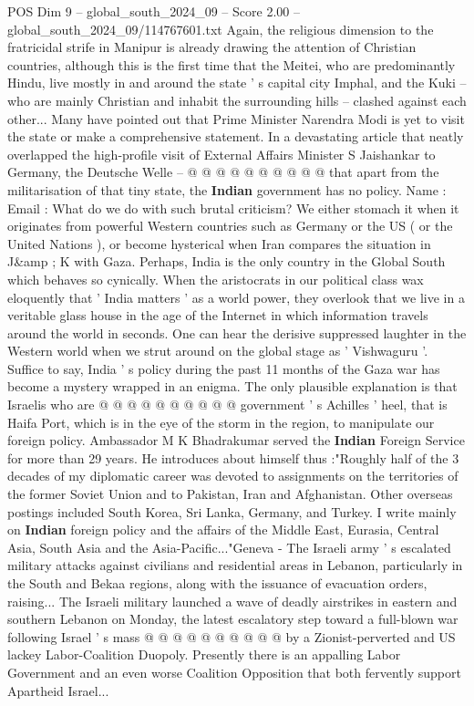 \begin{textsample}{POS Dim 9 – global\_south\_2024\_09 – Score 2.00 – global\_south\_2024\_09/114767601.txt}
Again, the religious dimension to the fratricidal strife in Manipur is already drawing the attention of Christian countries, although this is the first time that the Meitei, who are predominantly Hindu, live mostly in and around the state ' s capital city Imphal, and the Kuki -- who are mainly Christian and inhabit the surrounding hills -- clashed against each other...
Many have pointed out that Prime Minister Narendra Modi is yet to visit the state or make a comprehensive statement.
In a devastating article that neatly overlapped the high-profile visit of External Affairs Minister S Jaishankar to Germany, the Deutsche Welle -- @ @ @ @ @ @ @ @ @ @ that apart from the militarisation of that tiny state, the \textbf{Indian} government has no policy.
Name : Email : What do we do with such brutal criticism?
We either stomach it when it originates from powerful Western countries such as Germany or the US ( or the United Nations ), or become hysterical when Iran compares the situation in J\&amp ; K with Gaza.
Perhaps, India is the only country in the Global South which behaves so cynically.
When the aristocrats in our political class wax eloquently that ' India matters ' as a world power, they overlook that we live in a veritable glass house in the age of the Internet in which information travels around the world in seconds.
One can hear the derisive suppressed laughter in the Western world when we strut around on the global stage as ' Vishwaguru '.
Suffice to say, India ' s policy during the past 11 months of the Gaza war has become a mystery wrapped in an enigma.
The only plausible explanation is that Israelis who are @ @ @ @ @ @ @ @ @ @ government ' s Achilles ' heel, that is Haifa Port, which is in the eye of the storm in the region, to manipulate our foreign policy.
Ambassador M K Bhadrakumar served the \textbf{Indian} Foreign Service for more than 29 years.
He introduces about himself thus :"Roughly half of the 3 decades of my diplomatic career was devoted to assignments on the territories of the former Soviet Union and to Pakistan, Iran and Afghanistan.
Other overseas postings included South Korea, Sri Lanka, Germany, and Turkey.
I write mainly on \textbf{Indian} foreign policy and the affairs of the Middle East, Eurasia, Central Asia, South Asia and the Asia-Pacific..."Geneva - The Israeli army ' s escalated military attacks against civilians and residential areas in Lebanon, particularly in the South and Bekaa regions, along with the issuance of evacuation orders, raising...
The Israeli military launched a wave of deadly airstrikes in eastern and southern Lebanon on Monday, the latest escalatory step toward a full-blown war following Israel ' s mass @ @ @ @ @ @ @ @ @ @ by a Zionist-perverted and US lackey Labor-Coalition Duopoly.
Presently there is an appalling Labor Government and an even worse Coalition Opposition that both fervently support Apartheid Israel...

\end{textsample}
